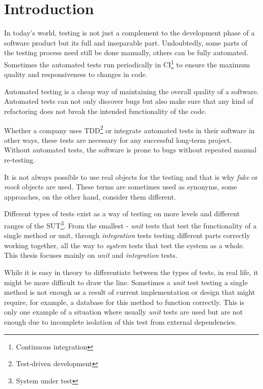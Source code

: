 \documentclass[
  print,
  table,
  nolof,
  nolot,
  nocover,
  oneside
]{fithesis3}
\begin{document}
\chapter{Introduction}

In today's world, testing is not just a complement to the development phase of a software product but its full and inseparable part. Undoubtedly, some parts of the testing process need still be done manually, others can be fully automated. Sometimes the automated tests run periodically in CI\footnote{Continuous integration} to ensure the maximum quality and responsiveness to changes in code.

Automated testing is a cheap way of maintaining the overall quality of a software. Automated tests can not only discover bugs but also make sure that any kind of refactoring does not break the intended functionality of the code.

Whether a company uses TDD\footnote{Test-driven development} or integrate automated tests in their software in other ways, these tests are necessary for any successful long-term project. Without automated tests, the software is prone to bugs without repeated manual re-testing.

It is not always possible to use real objects for the testing and that is why \textit{fake} or \textit{mock} objects are used. These terms are sometimes used as synonyms, some approaches, on the other hand, consider them different.

Different types of tests exist as a way of testing on more levels and different ranges of the SUT\footnote{System under test}. From the smallest - \textit{unit} tests that test the functionality of a single method or unit, through \textit{integration} tests testing different parts correctly working together, all the way to \textit{system} tests that test the system as a whole. This thesis focuses mainly on \textit{unit} and \textit{integration} tests.

While it is easy in theory to differentiate between the types of tests, in real life, it might be more difficult to draw the line. Sometimes a \textit{unit} test testing a single method is not enough as a result of current implementation or design that might require, for example, a database for this method to function correctly. This is only one example of a situation where usually \textit{unit} tests are used but are not enough due to incomplete isolation of this test from external dependencies.
\end{document}

